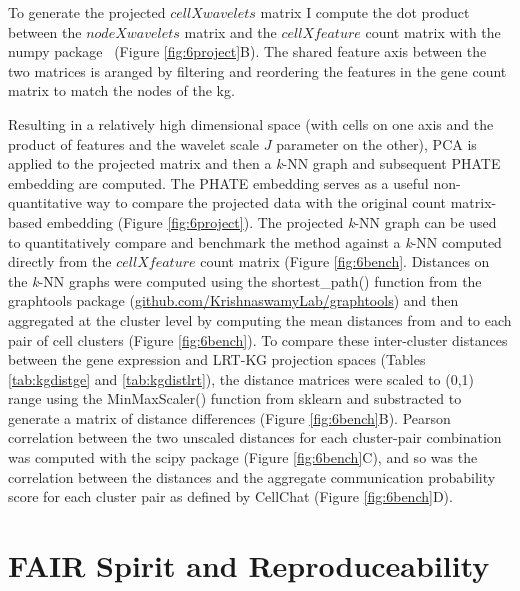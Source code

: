 To generate the projected \(cell X wavelets\) matrix I compute the dot product between the \(node X wavelets\) matrix and the \(cell X feature\) count matrix with the numpy package~\cite{harris_array_2020} (Figure \ref{fig:6project}B). The shared feature axis between the two matrices is aranged by filtering and reordering the features in the gene count matrix to match the nodes of the \acrshort{kg}.

Resulting in a relatively high dimensional space (with cells on one axis and the product of features and the wavelet scale \(J\) parameter on the other), PCA is applied to the projected matrix and then a \emph{k}-NN graph and subsequent PHATE embedding are computed. The PHATE embedding serves as a useful non-quantitative way to compare the projected data with the original count matrix-based embedding (Figure \ref{fig:6project}).
The projected \emph{k}-NN graph can be used to quantitatively compare and benchmark the method against a \emph{k}-NN computed directly from the \(cell X feature\) count matrix (Figure \ref{fig:6bench}. Distances on the \emph{k}-NN graphs were computed using the shortest\_path() function from the graphtools package (\url{github.com/KrishnaswamyLab/graphtools}) and then aggregated at the cluster level by computing the mean distances from and to each pair of cell clusters (Figure \ref{fig:6bench}). To compare these inter-cluster distances between the gene expression and LRT-KG projection spaces (Tables \ref{tab:kgdistge} and \ref{tab:kgdistlrt}), the distance matrices were scaled to (0,1) range using the MinMaxScaler() function from sklearn and substracted to generate a matrix of distance differences (Figure \ref{fig:6bench}B). Pearson correlation between the two unscaled distances for each cluster-pair combination was computed with the scipy package (Figure \ref{fig:6bench}C), and so was the correlation between the distances and the aggregate communication probability score for each cluster pair as defined by CellChat (Figure \ref{fig:6bench}D). 



\newpage
\section{FAIR Spirit and Reproduceability}

